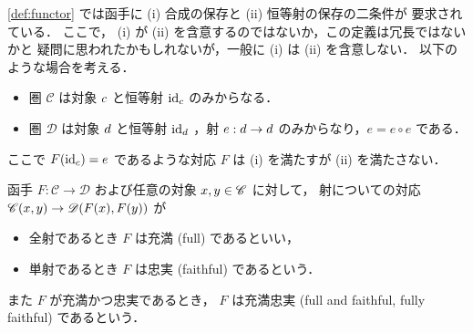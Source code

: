 \documentclass[titlepage]{ltjsreport}
\newcommand{\cat}[1]{\mathscr{#1}}
\newcommand{\obj}[1]{\lowercase{#1}}
\newcommand{\objs}[1]{#1}
\newcommand{\mrp}[3]{{#1}:{#2}\to{#3}}
\newcommand{\mrps}[3]{#1(#2,#3)}
\newcommand{\id}[1]{\mathrm{id}_{#1}}
\begin{document}
\begin{shadebox}
  \def\C{\cat{C}}%
  \def\D{\cat{D}}%
  \def\c{\obj{c}}%
  \def\d{\obj{d}}%
  \def\e{e}%
  \def\F{F}%
  \cref{def:functor} では函手に (i) 合成の保存と (ii) 恒等射の保存の二条件が
  要求されている．
  ここで， (i) が (ii) を含意するのではないか，この定義は冗長ではないかと
  疑問に思われたかもしれないが，一般に (i) は (ii) を含意しない．
  以下のような場合を考える．
  \begin{itemize}
    \item 圏 $\C$ は対象 $\c$ と恒等射 $\id{\c}$ のみからなる．
    \item 圏 $\D$ は対象 $\d$ と恒等射 $\id{\d}$ ，射 $\mrp{e}{\d}{\d}$
          のみからなり，$\e=\e\circ\e$ である．
  \end{itemize}
  ここで $\F(\id{\c})=\e$ であるような対応 $\F$ は
  (i) を満たすが (ii) を満たさない．
\end{shadebox}

\begin{definition}[充満，忠実，充満忠実]\label{def:full-faithful}
  \def\C{\cat{C}}%
  \def\D{\cat{D}}%
  \def\x{\obj{x}}%
  \def\y{\obj{y}}%
  函手 $\mrp{F}{\C}{\D}$ および任意の対象 $\x,\y\in\objs{\C}$ に対して，
  射についての対応 $\mrps{\C}{\x}{\y}\to\mrps{\D}{F(\x)}{F(\y)}$ が
  \begin{itemize}
    \item 全射であるとき $F$ は充満 (full) であるといい，
    \item 単射であるとき $F$ は忠実 (faithful) であるという．
  \end{itemize}
  また $F$ が充満かつ忠実であるとき，
  $F$ は充満忠実 (full and faithful, fully faithful) であるという．
\end{definition}
\end{document}
